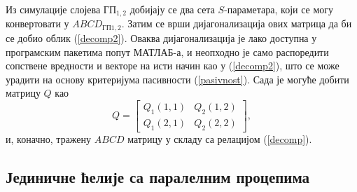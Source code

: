 Из симулације слојева $ГП_{1,2}$ добијају се два сета $S$-параметара, који се могу конвертовати у $ABCD_{ГП1,2}$. Затим се врши дијагонализација ових матрица да би се добио облик (\ref{decomp2}). Оваква дијагонализација је лако доступна у програмским пакетима попут МАТЛАБ-а, и неопходно је само распоредити сопствене вредности и векторе на исти начин као у (\ref{decomp2}), што се може урадити на основу критеријума пасивности (\ref{pasivnost}). Сада је могуће добити матрицу $Q$ као
\begin{equation}
Q =
\begin{bmatrix}
Q_1(1,1) & Q_2(1,2) \\
Q_1(2,1) & Q_2(2,2)
\end{bmatrix},
\end{equation}
и, коначно, тражену $ABCD$ матрицу у складу са релацијом (\ref{decomp}).

\subsection{Јединичне ћелије са паралелним процепима}

